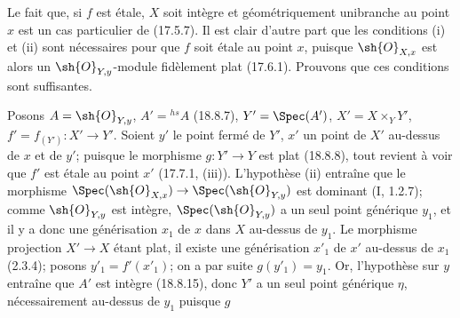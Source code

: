 Le fait que, si $f$ est étale, $X$ soit intègre et géométriquement unibranche au point $x$ est un cas particulier de (17.5.7). Il est clair d'autre part que les conditions (i) et (ii) sont nécessaires pour que $f$ soit étale au point $x$, puisque $\sh{O}_{X,x}$ est alors un $\sh{O}_{Y,y}$-module fidèlement plat (17.6.1). Prouvons que ces conditions sont suffisantes.

Posons $A=\sh{O}_{Y,y}$, $A'={}^{hs}\!A$ (18.8.7), $Y'=\Spec(A')$, $X'=X\times_Y Y'$, $f'=f_{(Y')}:X'\to Y'$. Soient $y'$ le point fermé de $Y'$, $x'$ un point de $X'$ au-dessus de $x$ et de $y'$; puisque le morphisme $g:Y'\to Y$ est plat (18.8.8), tout revient à voir que $f'$ est étale au point $x'$ (17.7.1, (iii)). L'hypothèse (ii) entraîne que le morphisme $\Spec(\sh{O}_{X,x})\to\Spec(\sh{O}_{Y,y})$ est dominant (I, 1.2.7); comme $\sh{O}_{Y,y}$ est intègre, $\Spec(\sh{O}_{Y,y})$ a un seul point générique $y_1$, et il y a donc une générisation $x_1$ de $x$ dans $X$ au-dessus de $y_1$. Le morphisme projection $X'\to X$ étant plat, il existe une générisation $x'_1$ de $x'$ au-dessus de $x_1$ (2.3.4); posons $y'_1=f'(x'_1)$; on a par suite $g(y'_1)=y_1$. Or, l'hypothèse sur $y$ entraîne que $A'$ est intègre (18.8.15), donc $Y'$ a un seul point générique $\eta$, nécessairement au-dessus de $y_1$ puisque $g$

